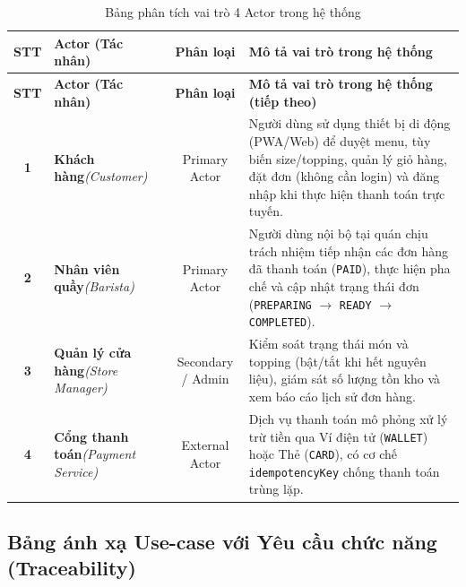 \documentclass[12pt,a4paper]{article}
\begin{document}
\vspace{0.2cm}
\noindent
\small
\renewcommand{\arraystretch}{1.3}
\begin{xltabular}{\textwidth}{|c|>{\raggedright\arraybackslash}p{3cm}|c|>{\raggedright\arraybackslash}X|}
\caption{Bảng phân tích vai trò 4 Actor trong hệ thống} \label{tab:actors} \\
\hline
{}
\textbf{STT} & \textbf{Actor (Tác nhân)} & \textbf{Phân loại} & \textbf{Mô tả vai trò trong hệ thống} \\
\hline
\endfirsthead

\hline
{}
\textbf{STT} & \textbf{Actor (Tác nhân)} & \textbf{Phân loại} & \textbf{Mô tả vai trò trong hệ thống (tiếp theo)} \\
\hline
\endhead

\hline
\endfoot

\hline
\endlastfoot

\textbf{1} & \textbf{Khách hàng}\newline\textit{(Customer)} & Primary Actor & Người dùng sử dụng thiết bị di động (PWA/Web) để duyệt menu, tùy biến size/topping, quản lý giỏ hàng, đặt đơn (không cần login) và đăng nhập khi thực hiện thanh toán trực tuyến. \\
\hline
\textbf{2} & \textbf{Nhân viên quầy}\newline\textit{(Barista)} & Primary Actor & Người dùng nội bộ tại quán chịu trách nhiệm tiếp nhận các đơn hàng đã thanh toán (\texttt{PAID}), thực hiện pha chế và cập nhật trạng thái đơn (\texttt{PREPARING} $\rightarrow$ \texttt{READY} $\rightarrow$ \texttt{COMPLETED}). \\
\hline
\textbf{3} & \textbf{Quản lý cửa hàng}\newline\textit{(Store Manager)} & Secondary / Admin & Kiểm soát trạng thái món và topping (bật/tắt khi hết nguyên liệu), giám sát số lượng tồn kho và xem báo cáo lịch sử đơn hàng. \\
\hline
\textbf{4} & \textbf{Cổng thanh toán}\newline\textit{(Payment Service)} & External Actor & Dịch vụ thanh toán mô phỏng xử lý trừ tiền qua Ví điện tử (\texttt{WALLET}) hoặc Thẻ (\texttt{CARD}), có cơ chế \texttt{idempotencyKey} chống thanh toán trùng lặp. \\
\end{xltabular}

\subsection{Bảng ánh xạ Use-case với Yêu cầu chức năng (Traceability)}
\end{document}
